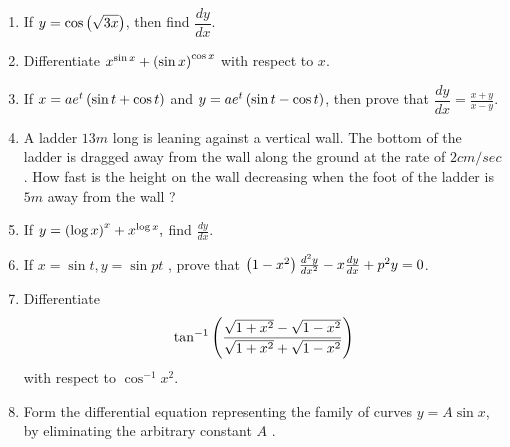 \begin{enumerate}
\item If ${y}=\cos\left(\sqrt{3x}\right)$, then find $\dfrac{dy}{dx}$.

\item Differentiate $x^{\sin x}+\left(\sin x\right)^{\cos x}$ with respect to $x$.

\item If ${x}=ae^t\left(\sin{t}+\cos{t}\right)$ and ${y}=ae^t\left(\sin{t}-\cos{t}\right)$, then prove that $\dfrac{dy}{dx}=\frac{x+y}{x-y}$.

\item A ladder $13 m$ long is leaning against a vertical wall. The bottom of the ladder is dragged away from the wall along the ground at the rate of $2 cm/sec$. How fast is the height on the wall decreasing when the foot of the ladder is $5 m$ away from the wall ?


\item If $y=\left(\log x\right)^{x}+x^{\log x},$ find $\frac{dy}{dx}$.


\item If $x = \sin t ,  y= \sin pt$ , prove that $\left(1-x^{2}\right)\frac{d^{2}y}{d x^{2}} - x \frac{dy}{dx} + p^{2}y=0$.

\item Differentiate 
\begin{align*}
  \tan^{-1}\left(\frac{\sqrt{1+x^{2}}-\sqrt{1-x^{2}}}{\sqrt{1+x^{2}}+\sqrt{1-x^{2}}}\right)
\end{align*} with respect to $\cos^{-1}x^{2}$.

\item Form the differential equation representing the family of curves $y = A \sin x $, by eliminating the arbitrary constant $A$ .
\end{enumerate}

